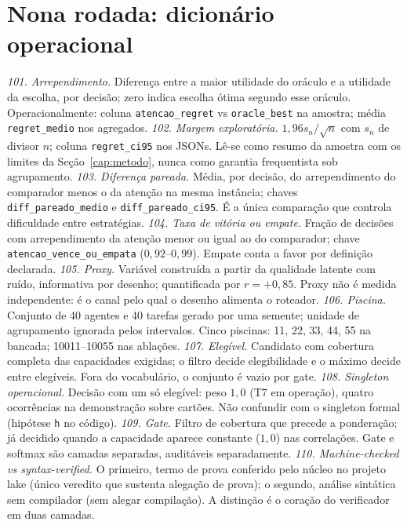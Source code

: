 \section{Nona rodada: dicionário operacional}
\textit{101. Arrependimento.} Diferença entre a maior utilidade do oráculo e a utilidade da escolha, por decisão; zero indica escolha ótima segundo esse oráculo. Operacionalmente: coluna \texttt{atencao\_regret} vs \texttt{oracle\_best} na amostra; média \texttt{regret\_medio} nos agregados.
\textit{102. Margem exploratória.} $1{,}96s_n/\sqrt{n}$ com $s_n$ de divisor $n$; coluna \texttt{regret\_ci95} nos JSONs. Lê-se como resumo da amostra com os limites da Seção~\ref{cap:metodo}, nunca como garantia frequentista sob agrupamento.
\textit{103. Diferença pareada.} Média, por decisão, do arrependimento do comparador menos o da atenção na mesma instância; chaves \texttt{diff\_pareado\_medio} e \texttt{diff\_pareado\_ci95}. É a única comparação que controla dificuldade entre estratégias.
\textit{104. Taxa de vitória ou empate.} Fração de decisões com arrependimento da atenção menor ou igual ao do comparador; chave \texttt{atencao\_vence\_ou\_empata} ($0{,}92$--$0{,}99$). Empate conta a favor por definição declarada.
\textit{105. Proxy.} Variável construída a partir da qualidade latente com ruído, informativa por desenho; quantificada por $r=+0{,}85$. Proxy não é medida independente: é o canal pelo qual o desenho alimenta o roteador.
\textit{106. Piscina.} Conjunto de 40 agentes e 40 tarefas gerado por uma semente; unidade de agrupamento ignorada pelos intervalos. Cinco piscinas: 11, 22, 33, 44, 55 na bancada; 10011--10055 nas ablações.
\textit{107. Elegível.} Candidato com cobertura completa das capacidades exigidas; o filtro decide elegibilidade e o máximo decide entre elegíveis. Fora do vocabulário, o conjunto é vazio por gate.
\textit{108. Singleton operacional.} Decisão com um só elegível: peso $1{,}0$ (T7 em operação), quatro ocorrências na demonstração sobre cartões. Não confundir com o singleton formal (hipótese \texttt{h} no código).
\textit{109. Gate.} Filtro de cobertura que precede a ponderação; já decidido quando a capacidade aparece constante ($1{,}0$) nas correlações. Gate e softmax são camadas separadas, auditáveis separadamente.
\textit{110. Machine-checked vs syntax-verified.} O primeiro, termo de prova conferido pelo núcleo no projeto lake (único veredito que sustenta alegação de prova); o segundo, análise sintática sem compilador (sem alegar compilação). A distinção é o coração do verificador em duas camadas.
